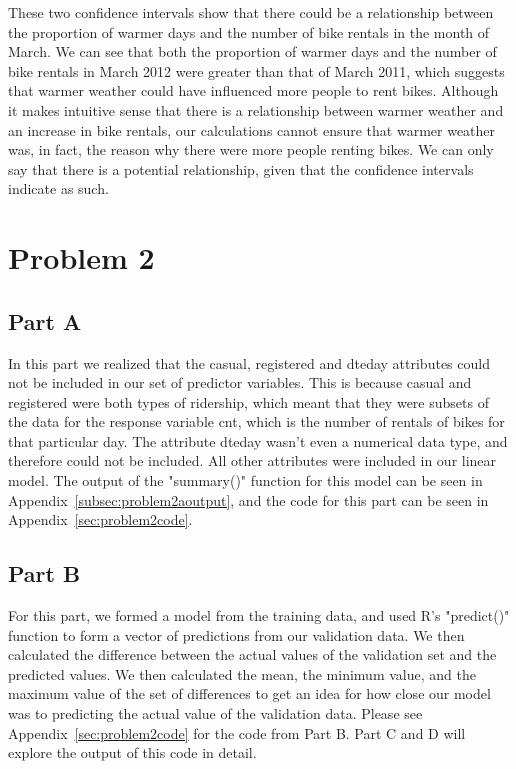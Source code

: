 \documentclass[11pt]{article}
\begin{document}
These two confidence intervals show that there could be a relationship between the proportion of warmer days and the number of bike rentals in the month of March. We can see that both the proportion of warmer days and the number of bike rentals in March 2012 were greater than that of March 2011, which suggests that warmer weather could have influenced more people to rent bikes. Although it makes intuitive sense that there is a relationship between warmer weather and an increase in bike rentals, our calculations cannot ensure that warmer weather was, in fact, the reason why there were more people renting bikes. We can only say that there is a potential relationship, given that the confidence intervals indicate as such. 
\pagebreak



\section{Problem 2}
\label{sec:problem2}
\subsection{Part A}
\label{subsec:2a}
In this part we realized that the casual, registered and dteday attributes could not be included in our set of predictor variables. This is because casual and registered were both types of ridership, which meant that they were subsets of the data for the response variable cnt, which is the number of rentals of bikes for that particular day. The attribute dteday wasn't even a numerical data type, and therefore could not be included. All other attributes were included in our linear model. The output of the "summary()" function for this model can be seen in Appendix~\ref{subsec:problem2aoutput}, and the code for this part can be seen in Appendix~\ref{sec:problem2code}.
\subsection{Part B}
\label{subsec:2b}
For this part, we formed a model from the training data, and used R's "predict()" function to form a vector of predictions from our validation data. We then calculated the difference between the actual values of the validation set and the predicted values. We then calculated the mean, the minimum value, and the maximum value of the set of differences to get an idea for how close our model was to predicting the actual value of the validation data. Please see Appendix~\ref{sec:problem2code} for the code from Part B. Part C and D will explore the output of this code in detail.   
\end{document}
